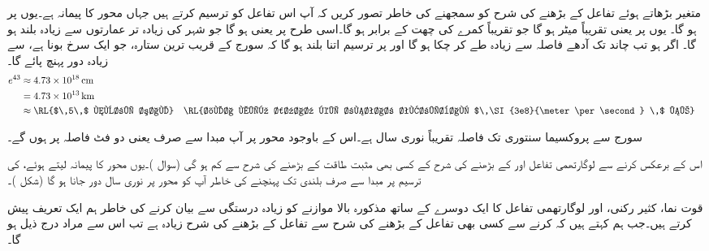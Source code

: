 متغیر  بڑھاتے ہوئے تفاعل  کے بڑھنے کی شرح کو سمجھنے کی خاطر تصور کریں کہ آپ اس تفاعل کو ترسیم کرتے ہیں جہاں محور کا پیمانہ   ہے۔یوں  پر  ہو گا۔ یوں  پر  یعنی تقریباً  میٹر ہو گا جو  تقریباً کمرے کی چھت کے برابر ہو گا۔اسی طرح  پر
  یعنی  ہو گا جو شہر کی  زیادہ تر عمارتوں سے زیادہ بلند ہو گا۔ اگر  ہو تب  چاند تک آدھے فاصلہ سے زیادہ طے کر چکا ہو گا اور  پر ترسیم اتنا بلند ہو گا کہ سورج کے قریب ترین  ستارہ،  جو ایک سرخ بونا ہے،  سے زیادہ دور  پہنچ پائے گا۔
\begin{align*}
e^{43}&\approx \SI{4.73e18}{\centi\meter}\\
&=\SI{4.73e13}{\kilo\meter}\\
&\approx \text{\RL{$\,5\,$ نوری سال}}&&\text{\RL{خلا میں شعاع کی رفتار تقریباً $\,\SI{3e8}{\meter\per\second} \,$ ہے}}
\end{align*} 

سورج سے پروکسیما سنتوری تک  فاصلہ تقریباً   نوری سال ہے۔اس کے باوجود محور  پر آپ مبدا سے صرف  یعنی دو فٹ  فاصلہ پر ہوں گے۔

اس کے برعکس  کرنے سے لوگارتھمی تفاعل  اور  کے بڑھنے کی شرح  کے کسی بھی مثبت طاقت کے بڑھنے کی شرح سے کم ہو گی (سوال )۔یوں   محور کا پیمانہ  لیتے ہوئے،   کی ترسیم پر  مبدا سے صرف  بلندی تک پہنچنے کی خاطر آپ کو محور  پر  نوری سال دور جانا ہو گا (شکل )۔

قوت نما، کثیر رکنی، اور لوگارتھمی تفاعل کا ایک دوسرے کے ساتھ مذکورہ بالا موازنے  کو زیادہ درستگی سے بیان کرنے کی خاطر ہم ایک تعریف پیش کرتے ہیں۔جب ہم کہتے ہیں کہ  کرنے سے کسی بھی تفاعل  کے بڑھنے کی شرح سے  تفاعل  کے بڑھنے کی شرح زیادہ ہے تب اس سے مراد درج ذیل ہو گا۔

